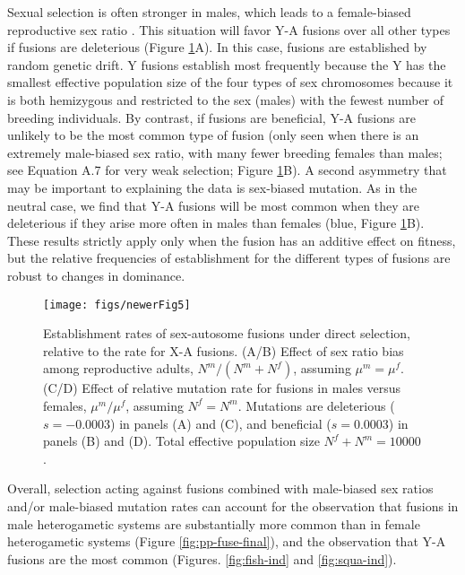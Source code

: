 Sexual selection is often stronger in males, which leads to a female-biased reproductive sex ratio \citep[that is, more reproducing females than males;][]{Bateman1948}. This situation will favor Y-A fusions over all other types if fusions are deleterious (Figure \ref{fig:fuse-direct}A). In this case, fusions are established by random genetic drift. Y fusions establish most frequently because the Y has the smallest effective population size of the four types of sex chromosomes because it is both hemizygous and restricted to the sex (males) with the fewest number of breeding individuals. By contrast, if fusions are beneficial, Y-A fusions are unlikely to be the most common type of fusion (only seen when there is an extremely male-biased sex ratio, with many fewer breeding females than males; see Equation A.7 for very weak selection; Figure \ref{fig:fuse-direct}B). A second asymmetry that may be important to explaining the data is sex-biased mutation. As in the neutral case, we find that Y-A fusions will be most common when they are deleterious if they arise more often in males than females (blue, Figure \ref{fig:fuse-direct}B). These results strictly apply only when the fusion has an additive effect on fitness, but the relative frequencies of establishment for the different types of fusions are robust to changes in dominance.

\begin{figure}
\centering
\texttt{[image: figs/newerFig5]}
\caption[Establishment rates of sex-autosome fusions under direct selection]{Establishment rates of sex-autosome fusions under direct selection, relative to the rate for X-A fusions. (A/B) Effect of sex ratio bias among reproductive adults, $N^m/(N^m + N^f)$, assuming $\mu^m=\mu^f$. (C/D) Effect of relative mutation rate for fusions in males versus females, $\mu^m/\mu^f$, assuming $N^f=N^m$. Mutations are deleterious ($s=-\text{0.0003}$) in panels (A) and (C), and beneficial ($s=\text{0.0003}$) in panels (B) and (D). Total effective population size $N^f+N^m=\text{10000}$.}
\label{fig:fuse-direct}
\end{figure}

Overall, selection acting against fusions combined with male-biased sex ratios and/or male-biased mutation rates can account for the observation that fusions in male heterogametic systems are substantially more common than in female heterogametic systems (Figure \ref{fig:pp-fuse-final}), and the observation that Y-A fusions are the most common (Figures. \ref{fig:fish-ind} and \ref{fig:squa-ind}). 

